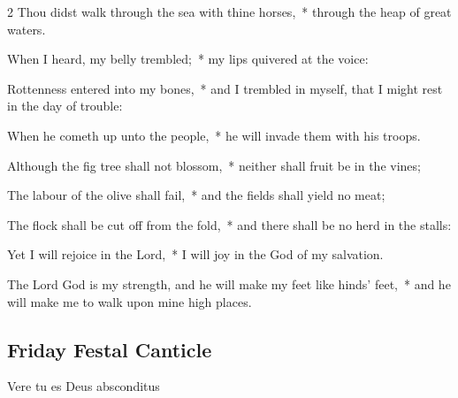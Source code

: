 \begin{multicols}{2}
Thou didst walk through the sea with thine horses,~* through the heap of great waters.\par
When I heard, my belly trembled;~* my lips quivered at the voice:\par
Rottenness entered into my bones,~* and I trembled in myself, that I might rest in the day of trouble:\par
When he cometh up unto the people,~* he will invade them with his troops.\par
Although the fig tree shall not blossom,~* neither shall fruit be in the vines;\par
The labour of the olive shall fail,~* and the fields shall yield no meat;\par
The flock shall be cut off from the fold,~* and there shall be no herd in the stalls:\par
Yet I will rejoice in the Lord,~* I will joy in the God of my salvation.\par
The Lord God is my strength, and he will make my feet like hinds' feet,~* and he will make me to walk upon mine high places.

\subsection{Friday Festal Canticle}

\begin{inhead}
Vere tu es Deus absconditus
\end{inhead}


\end{multicols}
